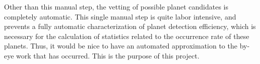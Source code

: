 Other than this manual step, the vetting of possible planet candidates is completely automatic.  This single manual step is quite labor intensive, and prevents a fully automatic characterization of planet detection efficiency, which is necessary for the calculation of statistics related to the occurrence rate of these planets.  Thus, it would be nice to have an automated approximation to the by-eye work that has occurred.  This is the purpose of this project.